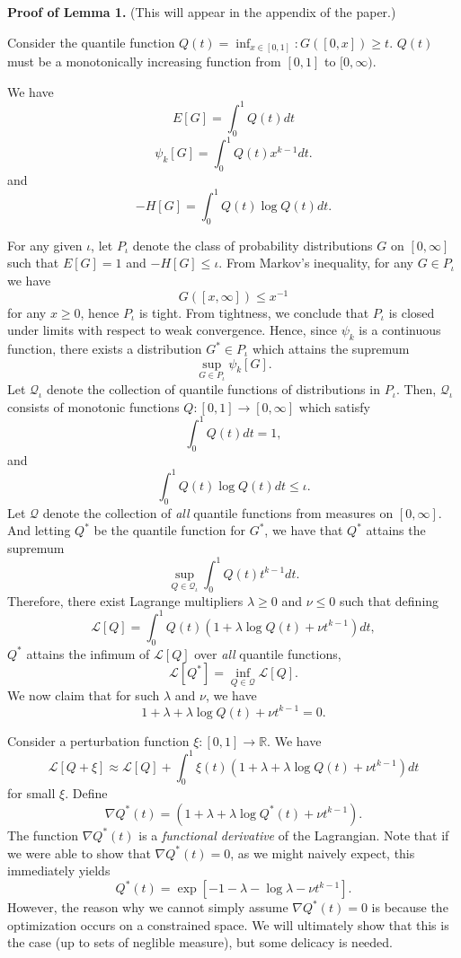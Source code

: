 \documentclass[12pt]{article}
\begin{document}
\textbf{Proof of Lemma 1.} (This will appear in the appendix of the paper.)

Consider the quantile function $Q(t) = \inf_{x \in [0,1]}: G([0, x]) \geq t.$
$Q(t)$ must be a monotonically increasing function from $[0,1]$ to $[0,\infty).$

We have
\[
E[G] = \int_0^1 Q(t) dt
\]
\[
\psi_k[G] = \int_0^1 Q(t) x^{k-1} dt.
\]
and
\[
-H[G] = \int_0^1 Q(t) \log Q(t) dt.
\]

For any given $\iota$, let $P_\iota$ denote the class of probability
distributions $G$ on $[0, \infty]$ such that $E[G]=1$ and
$-H[G] \leq \iota.$  From Markov's inequality, for any $G \in P_\iota$
we have
\[
G([x, \infty]) \leq x^{-1}
\]
for any $x \geq 0$, hence $P_\iota$ is tight.  From tightness, we
conclude that $P_\iota$ is closed under limits with respect to weak
convergence.  Hence, since $\psi_k$ is a continuous function, there
exists a distribution $G^* \in P_\iota$ which attains the supremum
\[\sup_{G \in P_\iota} \psi_k[G].\]
Let $\mathcal{Q}_\iota$ denote the collection of quantile functions of
distributions in $P_\iota.$ Then, $\mathcal{Q}_\iota$ consists of monotonic functions
$Q: [0,1] \to [0, \infty]$ which
satisfy
\[
\int_0^1 Q(t) dt = 1,
\]
and
\[
\int_0^1 Q(t) \log Q(t) dt \leq \iota.
\]
Let $\mathcal{Q}$ denote the collection of \emph{all} quantile functions from measures on $[0,\infty]$.
And letting $Q^*$ be the quantile function for $G^*$, we have that
$Q^*$ attains the supremum
\[
\sup_{Q \in \mathcal{Q}_\iota} \int_0^1 Q(t) t^{k-1} dt.
\]
Therefore, there exist Lagrange multipliers
$\lambda \geq 0$ and $\nu \leq 0$ such that defining
\[
\mathcal{L}[Q] = \int_0^1 Q(t) (1 + \lambda \log Q(t) + \nu t^{k-1}) dt,
\]
$Q^*$ attains the infimum of $\mathcal{L}[Q]$ over \emph{all} quantile functions,
\[
\mathcal{L}[Q^*] = \inf_{Q \in \mathcal{Q}}\mathcal{L}[Q].
\]
We now claim that for such $\lambda$ and $\nu$, we have
\[
1 + \lambda + \lambda \log Q(t) + \nu t^{k-1} = 0.
\]

Consider a perturbation function $\xi: [0,1] \to \mathbb{R}$.
We have
\[
\mathcal{L}[Q + \xi] \approx \mathcal{L}[Q] + \int_0^1 \xi(t) (1 + \lambda + \lambda \log Q(t) + \nu t^{k-1}) dt
\]
for small $\xi$.
Define
\[
\nabla Q^*(t) = (1 + \lambda + \lambda \log Q^*(t) + \nu t^{k-1}).
\]
The function $\nabla Q^*(t)$ is a \emph{functional derivative} of the Lagrangian.
Note that if we were able to show that $\nabla Q^*(t) = 0$, as we might naively expect,
this immediately yields
\begin{equation}\label{eq:Qstareq}
Q^*(t) = \exp[-1 - \lambda -\log \lambda - \nu t^{k-1}].
\end{equation}
However, the reason why we cannot simply assume $\nabla Q^*(t) = 0$ is
because the optimization occurs on a constrained space.  We will
ultimately show that this is the case (up to sets of neglible
measure), but some delicacy is needed.
\end{document}

